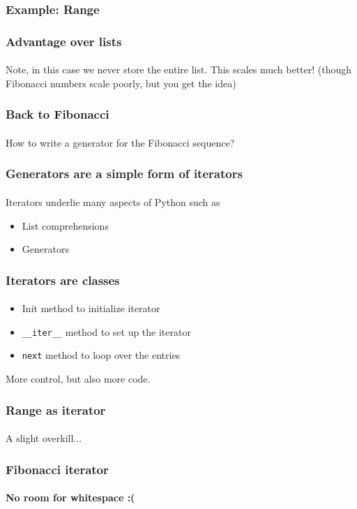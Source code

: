 \begin{frame}\frametitle{Example: Range}
    \framesubtitle{}


\end{frame}

\begin{frame}\frametitle{Advantage over lists}
    \framesubtitle{}

    Note, in this case we never store the entire list.
    \vfill
    This scales much better!
    \vfill
    (though Fibonacci numbers scale poorly, but you get the idea)

\end{frame}

\begin{frame}\frametitle{Back to Fibonacci}
    \framesubtitle{}

    How to write a generator for the Fibonacci sequence?


\end{frame}

\begin{frame}\frametitle{Generators are a simple form of iterators}
    \framesubtitle{}

    Iterators underlie many aspects of Python such as
    \begin{itemize}
        \item List comprehensions
        \item Generators
    \end{itemize}

\end{frame}

\begin{frame}[fragile]\frametitle{Iterators are classes}
    \framesubtitle{}

    \begin{itemize}
        \item Init method to initialize iterator
        \item \verb|__iter__| method to set up the iterator
        \item \verb|next| method to loop over the entries
    \end{itemize}

    More control, but also more code.

\end{frame}

\begin{frame}\frametitle{Range as iterator}
    \framesubtitle{}

    A slight overkill...

\end{frame}

\begin{frame}\frametitle{Fibonacci iterator}
    \framesubtitle{No room for whitespace :(}


\end{frame}

